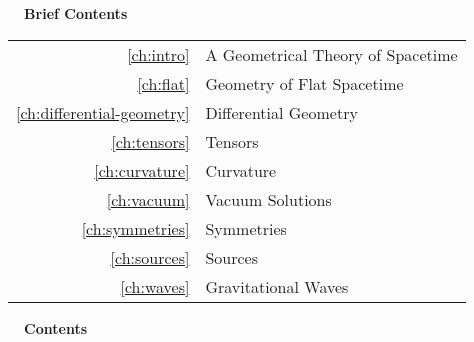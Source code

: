 \documentclass{genrel}
\begin{document}


\cleardoublepage





\pagebreak\vspace{100mm}

\hbox{}\noindent\huge\bfseries\sffamily{}\hspace{-2mm}\ \ Brief Contents\\
\hspace{-20mm}\noindent\mynormaltype\Large\sffamily{}\begin{tabular}{rl}
\ref{ch:intro} & A Geometrical Theory of Spacetime \quad \pageref{ch:intro}\\
\ref{ch:flat} & Geometry of Flat Spacetime \quad \pageref{ch:flat}\\
\ref{ch:differential-geometry} & Differential Geometry \quad \pageref{ch:differential-geometry}\\
\ref{ch:tensors} & Tensors \quad \pageref{ch:tensors}\\
\ref{ch:curvature} & Curvature \quad \pageref{ch:curvature}\\
\ref{ch:vacuum} & Vacuum Solutions \quad \pageref{ch:vacuum}\\
\ref{ch:symmetries} & Symmetries \quad \pageref{ch:symmetries}\\
\ref{ch:sources} & Sources \quad \pageref{ch:sources}\\
\ref{ch:waves} & Gravitational Waves \quad \pageref{ch:waves}\\
\end{tabular}
\mynormaltype

\vspace{100mm}\pagebreak

\cleardoublepage

\noindent\huge\bfseries\sffamily{}\hspace{-2mm}\ \ Contents\\
\mynormaltype

\tableofcontents

\vspace{5mm}

\end{document}
